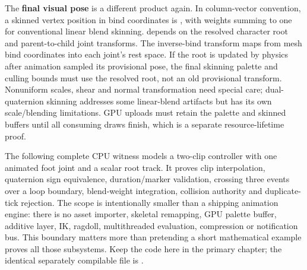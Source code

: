The \textbf{final visual pose} is a different product again. In column-vector convention, a skinned vertex position in bind coordinates is , with weights summing to one for conventional linear blend skinning.  depends on the resolved character root and parent-to-child joint transforms. The inverse-bind transform maps from mesh bind coordinates into each joint's rest space. If the root is updated by physics after animation sampled its provisional pose, the final skinning palette and culling bounds must use the resolved root, not an old provisional transform. Nonuniform scales, shear and normal transformation need special care; dual-quaternion skinning addresses some linear-blend artifacts but has its own scale/blending limitations. GPU uploads must retain the palette and skinned buffers until all consuming draws finish, which is a separate resource-lifetime proof.

The following complete CPU witness models a two-clip controller with one animated foot joint and a scalar root track. It proves clip interpolation, quaternion sign equivalence, duration/marker validation, crossing three events over a loop boundary, blend-weight integration, collision authority and duplicate-tick rejection. The scope is intentionally smaller than a shipping animation engine: there is no asset importer, skeletal remapping, GPU palette buffer, additive layer, IK, ragdoll, multithreaded evaluation, compression or notification bus. This boundary matters more than pretending a short mathematical example proves all those subsystems. Keep the code here in the primary chapter; the identical separately compilable file is .

